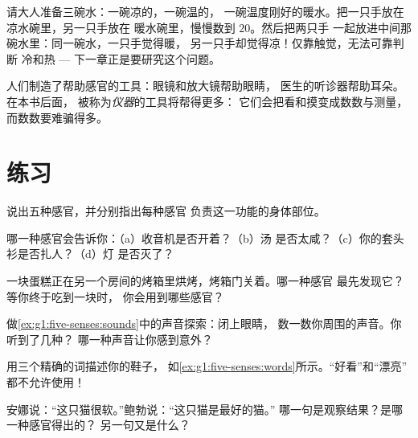 \begin{example}\label{ex:g1:five-senses:bowls}
请大人准备三碗水：一碗凉的，一碗温的，
一碗温度刚好的暖水。把一只手放在凉水碗里，另一只手放在
暖水碗里，慢慢数到 $20$。然后把两只手
一起放进中间那碗水里：同一碗水，一只手觉得暖，
另一只手却觉得凉！仅靠触觉，无法可靠判断
冷和热 --- 下一章正是要研究这个问题。
\end{example}

\begin{remark}[感官的帮手]\label{rem:g1:five-senses:tools}
人们制造了帮助感官的工具：眼镜和放大镜帮助眼睛，
医生的听诊器帮助耳朵。在本书后面，
被称为\emph{仪器}的工具将帮得更多：
它们会把看和摸变成数数与测量，
而数数要难骗得多。
\end{remark}

\section{练习}

\begin{exercise}[$\star$]\label{exo:g1:five-senses:1}
说出五种感官，并分别指出每种感官
负责这一功能的身体部位。
\end{exercise}

\begin{exercise}[$\star$]\label{exo:g1:five-senses:2}
哪一种感官会告诉你：（a）收音机是否开着？（b）汤
是否太咸？（c）你的套头衫是否扎人？（d）灯
是否灭了？
\end{exercise}

\begin{exercise}[$\star$]\label{exo:g1:five-senses:3}
一块蛋糕正在另一个房间的烤箱里烘烤，烤箱门关着。哪一种感官
最先发现它？等你终于吃到一块时，
你会用到哪些感官？
\end{exercise}

\begin{exercise}[$\star$]\label{exo:g1:five-senses:4}
做\cref{ex:g1:five-senses:sounds}中的声音探索：闭上眼睛，
数一数你周围的声音。你听到了几种？
哪一种声音让你感到意外？
\end{exercise}

\begin{exercise}[$\star$]\label{exo:g1:five-senses:5}
用三个精确的词描述你的鞋子，
如\cref{ex:g1:five-senses:words}所示。“好看”和“漂亮”
都不允许使用！
\end{exercise}

\begin{exercise}[$\star$]\label{exo:g1:five-senses:6}
安娜说：“这只猫很软。”鲍勃说：“这只猫是最好的猫。”
哪一句是观察结果？是哪一种感官得出的？
另一句又是什么？
\end{exercise}

